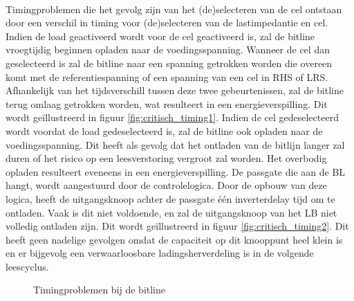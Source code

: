 \paragraph{}
Timingproblemen die het gevolg zijn van het (de)selecteren van de cel ontstaan door een verschil in timing voor (de)selecteren van de lastimpedantie en cel. Indien de load geactiveerd wordt voor de cel geactiveerd is, zal de bitline vroegtijdig beginnen opladen naar de voedingsspanning. Wanneer de cel dan geselecteerd is zal de bitline naar een spanning getrokken worden die overeen komt met de referentiespanning of een spanning van een cel in RHS of LRS. Afhankelijk van het tijdsverschill tussen deze twee gebeurtenissen, zal de bitline terug omlaag getrokken worden, wat resulteert in een energieverspilling. Dit wordt geïllustreerd in figuur \ref{fig:critisch_timing1}. Indien de cel gedeselecteerd wordt voordat de load gedeselecteerd is, zal de bitline ook opladen naar de voedingsspanning. Dit heeft als gevolg dat het ontladen van de bitlijn langer zal duren of het risico op een leesverstoring vergroot zal worden. Het overbodig opladen resulteert eveneens in een energieverspilling. De passgate die aan de BL hangt, wordt aangestuurd door de controlelogica. Door de opbouw van deze logica, heeft de uitgangsknoop achter de passgate één inverterdelay tijd om te ontladen. Vaak is dit niet voldoende, en zal de uitgangsknoop van het LB niet volledig ontladen zijn. Dit wordt geïllustreerd in figuur \ref{fig:critisch_timing2}.   Dit heeft geen nadelige gevolgen omdat de capaciteit op dit knooppunt heel klein is en er bijgevolg een verwaarloosbare ladingsherverdeling is in de volgende leescyclus. 


\begin{figure}[ht]
\centering
{}
\caption[Timingproblemen bij de bitline]{Timingproblemen bij de bitline}
\clearpage
\end{figure}

